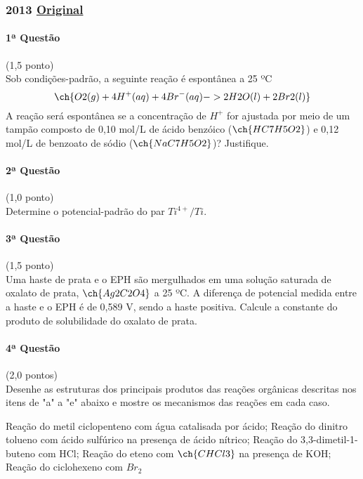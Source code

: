 \documentclass[12pt,a4paper]{article}
\newcommand{\original}[1]{\tiny \href{#1}{Original} \normalsize}
\begin{document}
\newpage
\subsubsection{2013 \original{https://drive.google.com/file/d/1xkOSkFuRNYj9ab0FD5wtkrv8BUNfQGjW/view?usp=sharing}}

\paragraph{1ª Questão} (1,5 ponto)\\
Sob condições-padrão, a seguinte reação é espontânea a 25 ºC $$\ch{O2 (g) + 4 H^+ (aq) + 4 Br^- (aq) -> 2 H2O (l) + 2 Br2 (l)}$$ A reação será espontânea se a concentração de $H^+$ for ajustada por meio de um tampão composto de 0,10 mol/L de ácido benzóico ($\ch{HC7H5O2}$) e 0,12 mol/L de benzoato de sódio ($\ch{NaC7H5O2}$)? Justifique.

\paragraph{2ª Questão} (1,0 ponto)\\
Determine o potencial-padrão do par $Ti^{4+}/Ti$.

\paragraph{3ª Questão} (1,5 ponto)\\
Uma haste de prata e o EPH são mergulhados em uma solução saturada de oxalato de prata, $\ch{Ag2C2O4}$ a 25 ºC. A diferença de potencial medida entre a haste e o EPH é de 0,589 V, sendo a haste positiva. Calcule a constante do produto de solubilidade do oxalato de prata.

\paragraph{4ª Questão} (2,0 pontos)\\
Desenhe as estruturas dos principais produtos das reações orgânicas descritas nos itens de "a" a "e" abaixo e mostre os mecanismos das reações em cada caso.
\begin{tasks}
\task Reação do metil ciclopenteno com água catalisada por ácido;
\task Reação do dinitro tolueno com ácido sulfúrico na presença de ácido nítrico;
\task Reação do 3,3-dimetil-1-buteno com HCl;
\task Reação do eteno com $\ch{CHCl3}$ na presença de KOH;
\task Reação do ciclohexeno com $Br_2$
\end{tasks}
\end{document}
